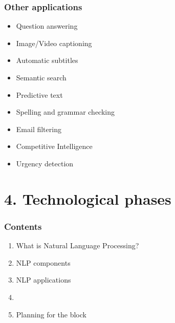 \documentclass{beamer}
\begin{document}
\begin{frame}

	\frametitle{Other applications}

\begin{itemize}
    \item Question answering
    \item Image/Video captioning
    \item Automatic subtitles
    \item Semantic search
    \item Predictive text
    \item Spelling and grammar checking
    \item Email filtering
    \item Competitive Intelligence
    \item Urgency detection
\end{itemize}
\end{frame}


\section{4. Technological phases}

\begin{frame}

    \frametitle{Contents}

	\large

    \begin{enumerate}
  
    	\item What is Natural Language Processing?
    	\item NLP components
    	\item NLP applications
    	\item {\bf \color{blue}{NLP technological phases}}
    	\item Planning for the block
    
    \end{enumerate}

\end{frame}
\end{document}
